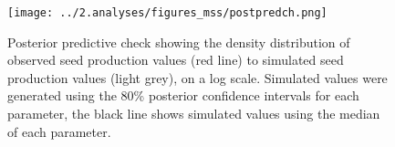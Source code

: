 \documentclass[a4,12pt]{article}
\begin{document}
    \begin{figure}[H]
        \texttt{[image: ../2.analyses/figures\_mss/postpredch.png]}
        \caption{Posterior predictive check showing the density distribution of observed seed production values (red line) to simulated seed production values (light grey), on a log scale. Simulated values were generated using the 80\% posterior confidence intervals for each parameter, the black line shows simulated values using the median of each parameter. }
        \label{fig:ppcheck}
    \end{figure}
  

    



\end{document}
